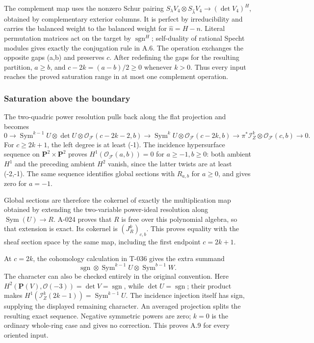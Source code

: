 \documentclass[
  10pt,
]{article}
\begin{document}
The complement map uses the nonzero Schur pairing
\(S_\lambda V_4\otimes S_{\widehat\lambda}V_4\to(\det V_4)^H\), obtained
by complementary exterior columns. It is perfect by irreducibility and
carries the balanced weight to the balanced weight for
\(\widehat n=H-n\). Literal permutation matrices act on the target by
\(\operatorname{sgn}^H\); self-duality of rational Specht modules gives
exactly the conjugation rule in A.6. The operation exchanges the
opposite gaps (a,b) and preserves \(c\). After redefining the gaps for
the resulting partition, \(a\ge b\), and \(c-2k=(a-b)/2\ge0\) whenever
\(k>0\). Thus every input reaches the proved saturation range in at most
one complement operation.

\subsubsection{Saturation above the
boundary}\label{saturation-above-the-boundary}

The two-quadric power resolution pulls back along the flat projection
and becomes \[
0\to\operatorname{Sym}^{k-1}U\otimes\det U\otimes
\mathcal O_{\mathcal F}(c-2k-2,b)
\to\operatorname{Sym}^kU\otimes\mathcal O_{\mathcal F}(c-2k,b)
\to\pi^*\mathcal I_Z^k\otimes\mathcal O_{\mathcal F}(c,b)\to0.
\] For \(c\ge2k+1\), the left degree is at least (-1). The incidence
hypersurface sequence on \(\mathbf P^2\times\mathbf P^2\) proves
\(H^1(\mathcal O_{\mathcal F}(a,b))=0\) for \(a\ge-1,b\ge0\): both
ambient \(H^1\) and the preceding ambient \(H^2\) vanish, since the
latter twists are at least (-2,-1). The same sequence identifies global
sections with \(R_{a,b}\) for \(a\ge0\), and gives zero for \(a=-1\).

Global sections are therefore the cokernel of exactly the multiplication
map obtained by extending the two-variable power-ideal resolution along
\(\operatorname{Sym}(U)\to R\). A-024 proves that \(R\) is free over
this polynomial algebra, so that extension is exact. Its cokernel is
\((J_R^k)_{c,b}\). This proves equality with the sheaf section space by
the same map, including the first endpoint \(c=2k+1\).

At \(c=2k\), the cohomology calculation in T-036 gives the extra summand
\[
\operatorname{sgn}\otimes\operatorname{Sym}^{k-1}U
\otimes\operatorname{Sym}^{b-1}W.
\] The character can also be checked entirely in the original
convention. Here
\(H^2(\mathbf P(V),\mathcal O(-3))=\det V=\operatorname{sgn}\), while
\(\det U=\operatorname{sgn}\); their product makes
\(H^1(\mathcal I_Z^k(2k-1))=\operatorname{Sym}^{k-1}U\). The incidence
injection itself has sign, supplying the displayed remaining character.
An averaged projection splits the resulting exact sequence. Negative
symmetric powers are zero; \(k=0\) is the ordinary whole-ring case and
gives no correction. This proves A.9 for every oriented input.
\end{document}
